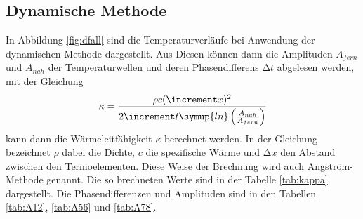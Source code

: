 \subsection{Dynamische Methode}
In Abbildung \ref{fig:dfall} sind die Temperaturverläufe bei Anwendung der
dynamischen Methode dargestellt. Aus Diesen können dann die Amplituden
$A_{fern}$ und $ A_{nah}$ der
Temperaturwellen und deren Phasendifferens $\increment t$ abgelesen werden,
mit der Gleichung
\begin{equation*}
  \kappa = \frac{\rho c (\increment x)^{2}}{
  2\increment t \symup{ln}\left(\frac{A_{nah}}{A_{fern}}\right)
  }
\end{equation*}
kann dann die Wärmeleitfähigkeit $\kappa$ berechnet werden. In der Gleichung
bezeichnet $\rho$ dabei die Dichte, $c$ die spezifische Wärme und $\increment x$
den Abstand zwischen den Termoelementen. Diese Weise der Brechnung wird auch
Angström-Methode genannt. Die so brechneten Werte sind in der Tabelle
\ref{tab:kappa} dargestellt. Die Phasendifferenzen und Amplituden sind in den
Tabellen \ref{tab:A12}, \ref{tab:A56} und \ref{tab:A78}. 


